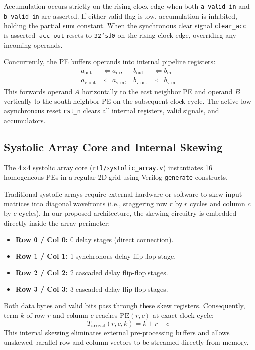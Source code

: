 \documentclass[conference]{IEEEtran}
\begin{document}
Accumulation occurs strictly on the rising clock edge when both \texttt{a\_valid\_in} and \texttt{b\_valid\_in} are asserted. If either valid flag is low, accumulation is inhibited, holding the partial sum constant. When the synchronous clear signal \texttt{clear\_acc} is asserted, \texttt{acc\_out} resets to \texttt{32'sd0} on the rising clock edge, overriding any incoming operands.

Concurrently, the PE buffers operands into internal pipeline registers:
\begin{align}
a_{\text{out}} &\Leftarrow a_{\text{in}}, & b_{\text{out}} &\Leftarrow b_{\text{in}} \\
a_{\text{v\_out}} &\Leftarrow a_{\text{v\_in}}, & b_{\text{v\_out}} &\Leftarrow b_{\text{v\_in}}
\end{align}
This forwards operand $A$ horizontally to the east neighbor PE and operand $B$ vertically to the south neighbor PE on the subsequent clock cycle. The active-low asynchronous reset \texttt{rst\_n} clears all internal registers, valid signals, and accumulators.

\subsection{Systolic Array Core and Internal Skewing}
The 4$\times$4 systolic array core (\texttt{rtl/systolic\_array.v}) instantiates 16 homogeneous PEs in a regular 2D grid using Verilog \texttt{generate} constructs.

Traditional systolic arrays require external hardware or software to skew input matrices into diagonal wavefronts (i.e., staggering row $r$ by $r$ cycles and column $c$ by $c$ cycles). In our proposed architecture, the skewing circuitry is embedded directly inside the array perimeter:
\begin{itemize}
    \item \textbf{Row 0 / Col 0:} 0 delay stages (direct connection).
    \item \textbf{Row 1 / Col 1:} 1 synchronous delay flip-flop stage.
    \item \textbf{Row 2 / Col 2:} 2 cascaded delay flip-flop stages.
    \item \textbf{Row 3 / Col 3:} 3 cascaded delay flip-flop stages.
\end{itemize}
Both data bytes and valid bits pass through these skew registers. Consequently, term $k$ of row $r$ and column $c$ reaches $\text{PE}(r, c)$ at exact clock cycle:
\begin{equation}
T_{\text{arrival}}(r, c, k) = k + r + c
\end{equation}
This internal skewing eliminates external pre-processing buffers and allows unskewed parallel row and column vectors to be streamed directly from memory.
\end{document}
